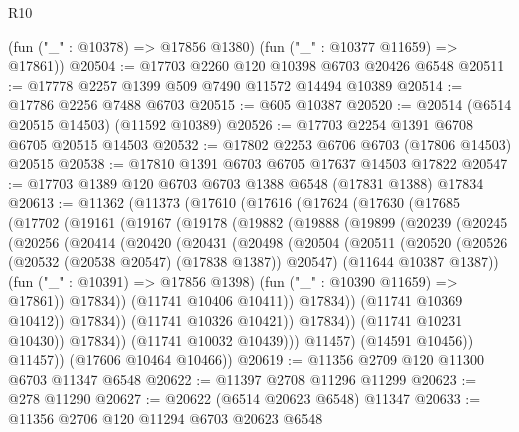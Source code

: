 \begin{lexlean}{R10}
\begin{coremodule}
      (fun ("_" : @10378) => @17856 @1380)
      (fun ("_" : @10377 @11659) => @17861))
@20504 := @17703 @2260 @120 @10398 @6703 @20426 @6548
@20511 := @17778 @2257 @1399 @509 @7490 @11572 @14494 @10389
@20514 := @17786 @2256 @7488 @6703
@20515 := @605 @10387
@20520 := @20514 (@6514 @20515 @14503) (@11592 @10389)
@20526 := @17703 @2254 @1391 @6708 @6705 @20515 @14503
@20532 := @17802 @2253 @6706 @6703 (@17806 @14503) @20515
@20538 := @17810 @1391 @6703 @6705 @17637 @14503 @17822
@20547 := @17703 @1389 @120 @6703 @6703 @1388 @6548 (@17831 @1388) @17834
@20613 := @11362
    (@11373
      (@17610
        (@17616
          (@17624
            (@17630
              (@17685
                (@17702
                  (@19161
                    (@19167
                      (@19178
                        (@19882
                          (@19888
                            (@19899
                              (@20239
                                (@20245
                                  (@20256
                                    (@20414
                                      (@20420
                                        (@20431
                                          (@20498
                                            (@20504
                                              (@20511
                                                (@20520
                                                  (@20526
                                                    (@20532 (@20538 @20547) (@17838 @1387))
                                                    @20547)
                                                  (@11644 @10387 @1387))
                                                (fun ("_" : @10391) => @17856 @1398)
                                                (fun ("_" : @10390 @11659) => @17861))
                                              @17834))
                                          (@11741 @10406 @10411))
                                        @17834))
                                    (@11741 @10369 @10412))
                                  @17834))
                              (@11741 @10326 @10421))
                            @17834))
                        (@11741 @10231 @10430))
                      @17834))
                  (@11741 @10032 @10439)))
              @11457)
            (@14591 @10456))
          @11457))
      (@17606 @10464 @10466))
@20619 := @11356 @2709 @120 @11300 @6703 @11347 @6548
@20622 := @11397 @2708 @11296 @11299
@20623 := @278 @11290
@20627 := @20622 (@6514 @20623 @6548) @11347
@20633 := @11356 @2706 @120 @11294 @6703 @20623 @6548

\end{coremodule}
\end{lexlean}
